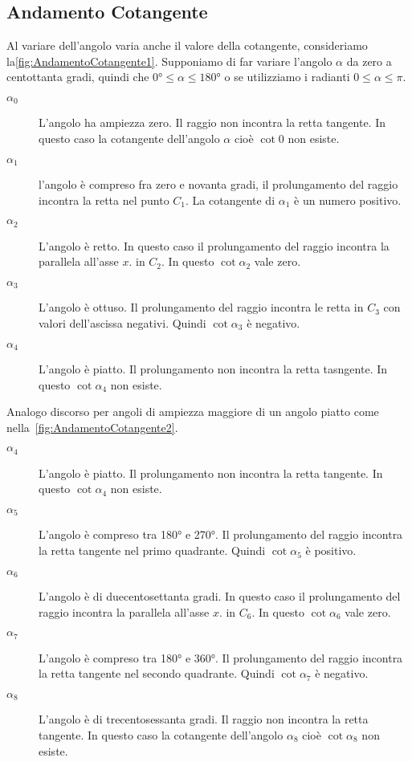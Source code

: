 \subsection{Andamento Cotangente}\label{sec:AndamentoCotangente}
Al variare dell'angolo varia anche il valore della cotangente, consideriamo la\nobs\vref{fig:AndamentoCotangente1}. Supponiamo di far variare l'angolo $\alpha$ da zero a centottanta gradi, quindi che $\ang{0}\leq\alpha\leq\ang{180}$ o se utilizziamo i radianti $0\leq\alpha\leq\pi$.
\begin{figure}
	\centering
	
	\label{fig:AndamentoCotangente1}
\end{figure}%
\begin{description}
	\item[$\alpha_0$] L'angolo ha ampiezza zero. Il raggio non incontra la retta tangente. In questo caso la cotangente dell'angolo $\alpha$ cioè $\cot 0$ non esiste.
	\item [$\alpha_1$] l'angolo è compreso fra zero e novanta gradi, il prolungamento del raggio incontra la retta nel punto $C_1$. La cotangente di $\alpha_1$ è un numero positivo.
	\item [$\alpha_2$] L'angolo è retto. In questo caso il prolungamento del raggio incontra la parallela all'asse $x$. in $C_2$. In questo $\cot\alpha_2$ vale zero. 
	\item [$\alpha_3$] L'angolo è ottuso. Il prolungamento del raggio incontra le retta in $ C_3$ con valori dell'ascissa negativi. Quindi $\cot\alpha_3$ è negativo.
	\item [$\alpha_4$] L'angolo è piatto. Il prolungamento non incontra la retta tasngente. In questo $\cot\alpha_4$ non esiste.
\end{description}
Analogo discorso per angoli di ampiezza maggiore di un angolo piatto come nella~\vref{fig:AndamentoCotangente2}.
\begin{description}
	\item [$\alpha_4$] L'angolo è piatto. Il prolungamento non incontra la retta tangente. In questo $\cot\alpha_4$ non esiste.
	\item [$\alpha_5$] L'angolo è compreso tra \ang{180} e \ang{270}. Il prolungamento del raggio incontra la retta tangente nel primo quadrante. Quindi $\cot\alpha_5$ è positivo.
	\item [$\alpha_6$] L'angolo è di duecentosettanta gradi. In questo caso il prolungamento del raggio incontra la parallela all'asse $x$. in $ C_6$. In questo $\cot\alpha_6$ vale zero. 
	\item [$\alpha_7$] L'angolo è compreso tra \ang{180} e \ang{360}. Il prolungamento del raggio incontra la retta tangente nel secondo quadrante. Quindi $\cot\alpha_7$ è negativo.
	\item [$\alpha_8$] L'angolo è di trecentosessanta gradi. Il raggio non incontra la retta tangente. In questo caso la cotangente dell'angolo $\alpha_8$ cioè $\cot\alpha_8$ non esiste.
\end{description}
